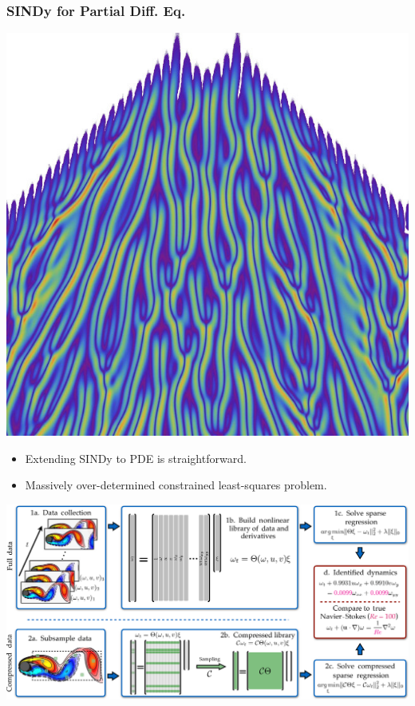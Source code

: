 \documentclass[aspectratio=169,compress,12pt]{beamer}
\begin{document}
\begin{frame}
    \frametitle{SINDy for Partial Diff. Eq.}
    \vfill
    \begin{minipage}{.28\textwidth}
        \centering
        \includegraphics[width=\textwidth]{imgs/kuramoto.png}
    \end{minipage}%
    \hfill
    \begin{minipage}{.68\textwidth}
        \begin{itemize}
            \item Extending SINDy to PDE is straightforward.
            \par\bigskip
            \item Massively over-determined constrained least-squares problem.
        \end{itemize}
    \end{minipage}
    \vfill
\end{frame}

\begin{frame}
    \vfill
    \centering
    \includegraphics[width=\textwidth]{imgs/pde_find.png}
    \vfill
\end{frame}
\end{document}
